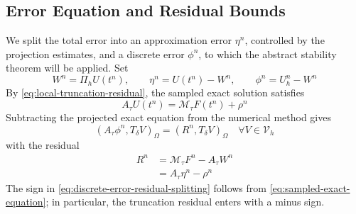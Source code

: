 \documentclass[11pt]{article}
\begin{document}
\subsection{Error Equation and Residual Bounds}
\label{subsec:residual-error-equation}
We split the total error into an approximation error \(\eta^n\), controlled by
the projection estimates, and a discrete error \(\phi^n\), to which the
abstract stability theorem will be applied. Set
\begin{equation}
W^n=\Pi_hU(t^n),\qquad
\eta^n=U(t^n)-W^n,\qquad
\phi^n=U_h^n-W^n \label{eq:error-splitting}
\end{equation}
By \eqref{eq:local-truncation-residual}, the sampled exact solution satisfies
\begin{equation}
A_{\tau}U(t^n)=\mathcal M_{\tau}F(t^n)+\rho^n \label{eq:sampled-exact-equation}
\end{equation}
Subtracting the projected exact equation from the numerical method gives
\begin{equation}
(A_{\tau}\phi^n,T_{\delta}V)_{\Omega}
=(R^n,T_{\delta}V)_{\Omega}
\quad \forall V\in\mathcal V_h \label{eq:error-equation}
\end{equation}
with the residual
\begin{align}
R^n&=\mathcal M_{\tau}F^n-A_{\tau}W^n \label{eq:discrete-error-residual-definition}\\
&=A_{\tau}\eta^n-\rho^n \label{eq:discrete-error-residual-splitting}
\end{align}
The sign in \eqref{eq:discrete-error-residual-splitting} follows from
\eqref{eq:sampled-exact-equation}; in particular, the truncation residual
enters with a minus sign.
\end{document}

